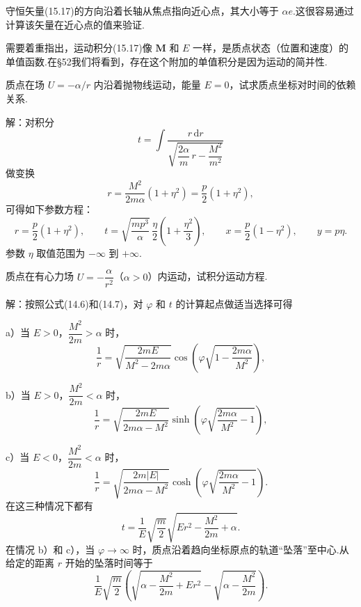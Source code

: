 守恒矢量(15.17)的方向沿着长轴从焦点指向近心点，其大小等于 $\alpha e$.这很容易通过计算该矢量在近心点的值来验证.

需要着重指出，运动积分(15.17)像 $\boldsymbol{M}$ 和 $E$ 一样，是质点状态（位置和速度）的单值函数.在§52我们将看到，存在这个附加的单值积分是因为运动的简并性.

\begin{xiti}

\quad 质点在场 $U=-\alpha/r$ 内沿着抛物线运动，能量 $E=0$，试求质点坐标对时间的依赖关系.

解：对积分
\begin{equation*}
  t=\int\frac{r\,\mathrm{d}r}
  {\sqrt{\dfrac{2\alpha}{m}\,r-\dfrac{M^2}{m^2}}}
\end{equation*}
做变换
\begin{equation*}
  r=\frac{M^2}{2m\alpha}\left(1+\eta^2\right)
  =\frac{p}{2}\left(1+\eta^2\right),
\end{equation*}
可得如下参数方程：
\begin{equation*}
  r=\frac{p}{2}\left(1+\eta^2\right),\qquad
  t=\sqrt{\frac{mp^3}{\alpha}}\,\frac{\eta}{2}
  \left(1+\frac{\eta^2}{3}\right),\qquad
  x=\frac{p}{2}\left(1-\eta^2\right),\qquad
  y=p\eta.
\end{equation*}
参数 $\eta$ 取值范围为 $-\infty$ 到 $+\infty$.

\quad 质点在有心力场 $U=-\dfrac{\alpha}{r^2}$（$\alpha>0$）内运动，试积分运动方程.

解：按照公式(14.6)和(14.7)，对 $\varphi$ 和 $t$ 的计算起点做适当选择可得

a）当 $E>0$，$\dfrac{M^2}{2m}>\alpha$ 时，
\begin{equation*}
  \frac{1}{r}=\sqrt{\frac{2mE}{M^2-2m\alpha}}
  \cos\left(\varphi\sqrt{1-\frac{2m\alpha}{M^2}}\right),
\end{equation*}

b）当 $E>0$，$\dfrac{M^2}{2m}<\alpha$ 时，
\begin{equation*}
  \frac{1}{r}=\sqrt{\frac{2mE}{2m\alpha-M^2}}
  \sinh\left(\varphi\sqrt{\frac{2m\alpha}{M^2}-1}\right),
\end{equation*}

c）当 $E<0$，$\dfrac{M^2}{2m}<\alpha$ 时，
\begin{equation*}
  \frac{1}{r}=\sqrt{\frac{2m|E|}{2m\alpha-M^2}}
  \cosh\left(\varphi\sqrt{\frac{2m\alpha}{M^2}-1}\right).
\end{equation*}
在这三种情况下都有
\begin{equation*}
  t=\frac{1}{E}\sqrt{\frac{m}{2}}
  \sqrt{Er^2-\frac{M^2}{2m}+\alpha}.
\end{equation*}
在情况 b）和 c），当 $\varphi\to\infty$ 时，质点沿着趋向坐标原点的轨道“坠落”至中心.从给定的距离 $r$ 开始的坠落时间等于
\begin{equation*}
  \frac{1}{E}\sqrt{\frac{m}{2}}
  \left(\sqrt{\alpha-\frac{M^2}{2m}+Er^2}
  -\sqrt{\alpha-\frac{M^2}{2m}}\right).
\end{equation*}


\end{xiti}

